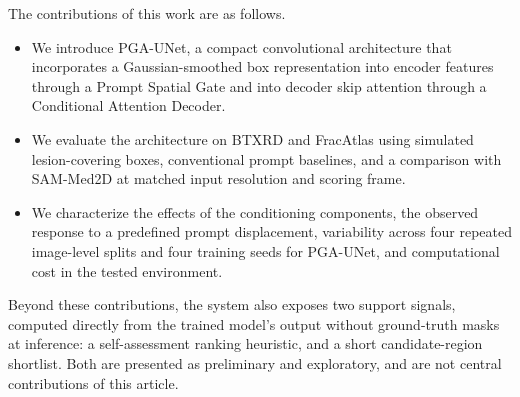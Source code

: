 The contributions of this work are as follows.
\begin{itemize}
\item We introduce PGA-UNet, a compact convolutional architecture that incorporates a Gaussian-smoothed box representation into encoder features through a Prompt Spatial Gate and into decoder skip attention through a Conditional Attention Decoder.
\item We evaluate the architecture on BTXRD and FracAtlas using simulated lesion-covering boxes, conventional prompt baselines, and a comparison with SAM-Med2D at matched input resolution and scoring frame.
\item We characterize the effects of the conditioning components, the observed response to a predefined prompt displacement, variability across four repeated image-level splits and four training seeds for PGA-UNet, and computational cost in the tested environment.
\end{itemize}

Beyond these contributions, the system also exposes two support signals, computed directly from the trained model's output without ground-truth masks at inference: a self-assessment ranking heuristic, and a short candidate-region shortlist. Both are presented as preliminary and exploratory, and are not central contributions of this article.
